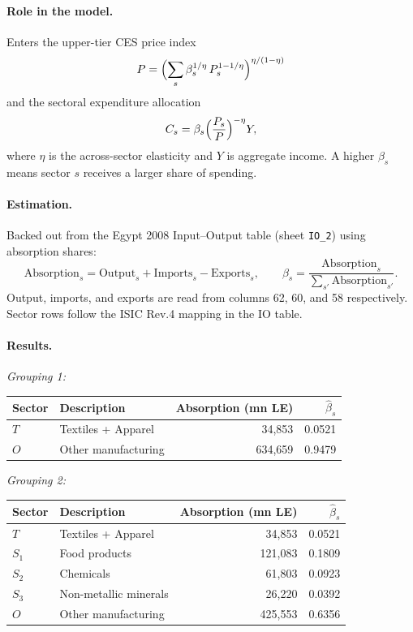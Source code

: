 \documentclass[12pt]{article}
\begin{document}
\paragraph{Role in the model.}
Enters the upper-tier CES price index
\[
P = \Bigl(\sum_s \beta_s^{1/\eta}\, P_s^{1-1/\eta}\Bigr)^{\eta/(1-\eta)}
\]
and the sectoral expenditure allocation
\[
C_s = \beta_s \Bigl(\frac{P_s}{P}\Bigr)^{-\eta} Y,
\]
where $\eta$ is the across-sector elasticity and $Y$ is aggregate income.
A higher $\beta_s$ means sector $s$ receives a larger share of spending.

\paragraph{Estimation.}
Backed out from the Egypt 2008 Input--Output table (sheet \texttt{IO\_2})
using absorption shares:
\[
\text{Absorption}_s = \text{Output}_s + \text{Imports}_s - \text{Exports}_s,
\qquad
\beta_s = \frac{\text{Absorption}_s}{\sum_{s'} \text{Absorption}_{s'}}.
\]
Output, imports, and exports are read from columns 62, 60, and 58
respectively. Sector rows follow the ISIC Rev.4 mapping in the IO table.

\paragraph{Results.}

\medskip
\noindent\textit{Grouping 1:}
\begin{center}
\begin{tabular}{llrr}
\toprule
Sector & Description & Absorption (mn LE) & $\hat\beta_s$ \\
\midrule
$T$ & Textiles + Apparel & 34,853 & 0.0521 \\
$O$ & Other manufacturing & 634,659 & 0.9479 \\
\bottomrule
\end{tabular}
\end{center}

\noindent\textit{Grouping 2:}
\begin{center}
\begin{tabular}{llrr}
\toprule
Sector & Description & Absorption (mn LE) & $\hat\beta_s$ \\
\midrule
$T$   & Textiles + Apparel      & 34,853  & 0.0521 \\
$S_1$ & Food products           & 121,083 & 0.1809 \\
$S_2$ & Chemicals               & 61,803  & 0.0923 \\
$S_3$ & Non-metallic minerals   & 26,220  & 0.0392 \\
$O$   & Other manufacturing     & 425,553 & 0.6356 \\
\bottomrule
\end{tabular}
\end{center}
\end{document}
